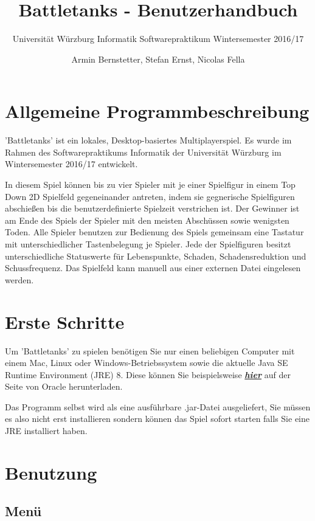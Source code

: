 \documentclass[a4paper]{scrartcl}
\title{Battletanks - Benutzerhandbuch}
\subtitle{Universität Würzburg Informatik Softwarepraktikum Wintersemester 2016/17}
\author{Armin Bernstetter, Stefan Ernst, Nicolas Fella}
\begin{document}
\maketitle
\tableofcontents
\newpage

\section{Allgemeine Programmbeschreibung}
'Battletanks' ist ein lokales, Desktop-basiertes Multiplayerspiel. Es wurde im Rahmen des Softwarepraktikums Informatik der Universität Würzburg im Wintersemester 2016/17 entwickelt.

In diesem Spiel können bis zu vier Spieler mit je einer Spielfigur in einem Top Down 2D Spielfeld gegeneinander antreten, indem sie gegnerische Spielfiguren abschießen bis die benutzerdefinierte Spielzeit verstrichen ist. Der Gewinner ist am Ende des Spiels der Spieler mit den meisten Abschüssen sowie wenigsten Toden.
Alle Spieler benutzen zur Bedienung des Spiels gemeinsam eine Tastatur mit unterschiedlicher Tastenbelegung je Spieler. Jede der Spielfiguren besitzt unterschiedliche Statuswerte für Lebenspunkte, Schaden, Schadensreduktion und Schussfrequenz.
Das Spielfeld kann manuell aus einer externen Datei eingelesen werden.



\section{Erste Schritte}
Um 'Battletanks' zu spielen benötigen Sie nur einen beliebigen Computer mit einem Mac, Linux oder Windows-Betriebssystem sowie die aktuelle Java SE Runtime Environment (JRE) 8. Diese können Sie beispielsweise \href{http://www.oracle.com/technetwork/java/javase/downloads/jre8-downloads-2133155.html}{\textbf{\textit{hier}}} auf der Seite von Oracle herunterladen.

Das Programm selbst wird als eine ausführbare .jar-Datei ausgeliefert, Sie müssen es also nicht erst installieren sondern können das Spiel sofort starten falls Sie eine JRE installiert haben.

\newpage
\section{Benutzung}
\subsection{Menü}
\end{document}
